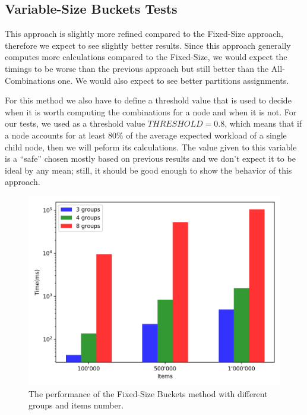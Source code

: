 \subsection{Variable-Size Buckets Tests}\label{sec:Variable-Size-buckets-tests}
This approach is slightly more refined compared to the Fixed-Size approach, therefore we expect to see slightly better results. Since this approach generally computes more calculations compared to the Fixed-Size, we would expect the timings to be worse than the previous approach but still better than the All-Combinations one. We would also expect to see better partitions assignments.

For this method we also have to define a threshold value that is used to decide when it is worth computing the combinations for a node and when it is not. For our tests, we used as a threshold value $THRESHOLD = 0.8$, which means that if a node accounts for at least 80\% of the average expected workload of a single child node, then we will peform its calculations. The value given to this variable is a ``safe'' chosen mostly based on previous results and we don't expect it to be ideal by any mean; still, it should be good enough to show the behavior of this approach.

\begin{figure}[!htb]
  \centering
  \includegraphics[width=\textwidth,height=\textheight,keepaspectratio]{img/dynamic.png}
  \caption[caption]{The performance of the Fixed-Size Buckets method with different groups and items number.}
  \label{fig:dynamic}
\end{figure}

